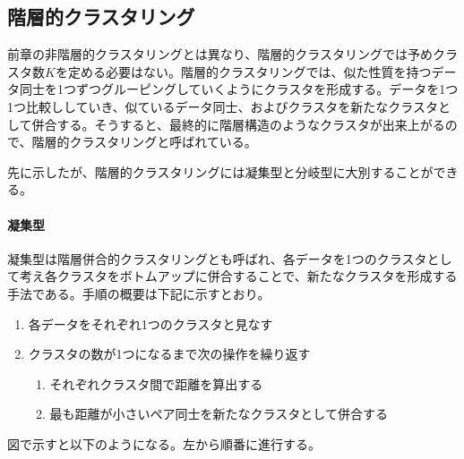 \documentclass[dvipdfmx]{jsarticle}
\begin{document}
\subsection{階層的クラスタリング}
前章の非階層的クラスタリングとは異なり、階層的クラスタリングでは予めクラスタ数$K$を定める必要はない。階層的クラスタリングでは、似た性質を持つデータ同士を1つずつグルーピングしていくようにクラスタを形成する。データを1つ1つ比較ししていき、似ているデータ同士、およびクラスタを新たなクラスタとして併合する。そうすると、最終的に階層構造のようなクラスタが出来上がるので、階層的クラスタリングと呼ばれている。\par
先に示したが、階層的クラスタリングには凝集型と分岐型に大別することができる。
\paragraph{凝集型}
凝集型は階層併合的クラスタリングとも呼ばれ、各データを1つのクラスタとして考え各クラスタをボトムアップに併合することで、新たなクラスタを形成する手法である。手順の概要は下記に示すとおり。
\begin{enumerate}
  \item 各データをそれぞれ1つのクラスタと見なす
  \item クラスタの数が1つになるまで次の操作を繰り返す
  \begin{enumerate}
    \item それぞれクラスタ間で距離を算出する
    \item 最も距離が小さいペア同士を新たなクラスタとして併合する
  \end{enumerate}
\end{enumerate}
図で示すと以下のようになる。左から順番に進行する。
\end{document}
